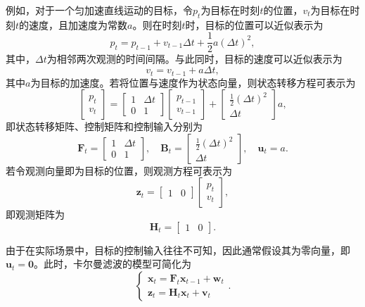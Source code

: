 例如，对于一个匀加速直线运动的目标，令\( p_t \)为目标在时刻\( t \)的位置，\( v_t \)为目标在时刻\( t \)的速度，且加速度为常数\( a \)。则在时刻\( t \)时，目标的位置可以近似表示为
\[
    p_t = p_{t-1} + v_{t-1} \Delta t + \frac{1}{2} a (\Delta t)^2,
\]
其中，\( \Delta t \)为相邻两次观测的时间间隔。与此同时，目标的速度可以近似表示为
\[
    v_t = v_{t-1} + a \Delta t,
\]
其中\( a \)为目标的加速度。若将位置与速度作为状态向量，则状态转移方程可表示为
\[
    \begin{bmatrix} p_t \\ v_t \end{bmatrix} = \begin{bmatrix} 1 & \Delta t \\ 0 & 1 \end{bmatrix} \begin{bmatrix} p_{t-1} \\ v_{t-1} \end{bmatrix} + \begin{bmatrix} \frac{1}{2} (\Delta t)^2 \\ \Delta t \end{bmatrix} a,
\]
即状态转移矩阵、控制矩阵和控制输入分别为
\[
    \mathbf{F}_t = \begin{bmatrix} 1 & \Delta t \\ 0 & 1 \end{bmatrix}, \quad    \mathbf{B}_t = \begin{bmatrix} \frac{1}{2} (\Delta t)^2 \\ \Delta t \end{bmatrix}, \quad \bm{u}_t = a.
\]
若令观测向量即为目标的位置，则观测方程可表示为
\[
    \bm{z}_t = \begin{bmatrix} 1 & 0 \end{bmatrix} \begin{bmatrix} p_t \\ v_t \end{bmatrix},
\]
即观测矩阵为
\[
    \mathbf{H}_t = \begin{bmatrix} 1 & 0 \end{bmatrix}.
\]

由于在实际场景中，目标的控制输入往往不可知，因此通常假设其为零向量，即\( \bm{u}_t = \bm{0} \)。此时，卡尔曼滤波的模型可简化为
\[
    \begin{cases}
        \bm{x}_t = \mathbf{F}_t \bm{x}_{t-1} + \bm{w}_t \\
        \bm{z}_t = \mathbf{H}_t \bm{x}_t + \bm{v}_t
    \end{cases}.
\]

